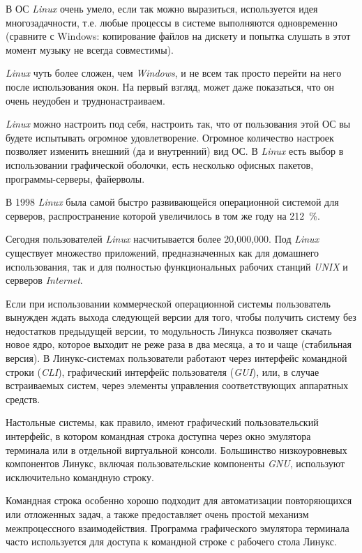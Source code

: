 В ОС \textit{Linux} очень умело, если так можно выразиться, используется идея многозадачности, т.е. любые процессы в системе выполняются одновременно (сравните с Windows: копирование файлов на дискету и попытка слушать в этот момент музыку не всегда совместимы).

\textit{Linux} чуть более сложен, чем \textit{Windows}, и не всем так просто перейти на него после использования окон. На первый взгляд, может даже показаться, что он очень неудобен и труднонастраиваем.

\textit{Linux} можно настроить под себя, настроить так, что от пользования этой ОС вы будете испытывать огромное удовлетворение. Огромное количество настроек позволяет изменить внешний (да и внутренний) вид ОС. В \textit{Linux} есть выбор в использовании графической оболочки, есть несколько офисных пакетов, программы-серверы, файерволы.

В 1998 \textit{Linux} была самой быстро развивающейся операционной системой для серверов, распространение которой увеличилось в том же году на 212~\%.

Сегодня пользователей \textit{Linux} насчитывается более 20,000,000. Под \textit{Linux} существует множество приложений, предназначенных как для домашнего использования, так и для полностью функциональных рабочих станций \textit{UNIX} и серверов \textit{Internet}.

Если при использовании коммерческой операционной системы пользователь вынужден ждать выхода следующей версии для того, чтобы получить систему без недостатков предыдущей версии, то модульность Линукса позволяет скачать новое ядро, которое выходит не реже раза в два месяца, а то и чаще (стабильная версия). В Линукс-системах пользователи работают через интерфейс командной строки (\textit{CLI}), графический интерфейс пользователя (\textit{GUI}), или, в случае встраиваемых систем, через элементы управления соответствующих аппаратных средств.

Настольные системы, как правило, имеют графический пользовательский интерфейс, в котором командная строка доступна через окно эмулятора терминала или в отдельной виртуальной консоли. Большинство низкоуровневых компонентов Линукс, включая пользовательские компоненты \textit{GNU}, используют исключительно командную строку.

Командная строка особенно хорошо подходит для автоматизации повторяющихся или отложенных задач, а также предоставляет очень простой механизм межпроцессного взаимодействия. Программа графического эмулятора терминала часто используется для доступа к командной строке с рабочего стола Линукс.

